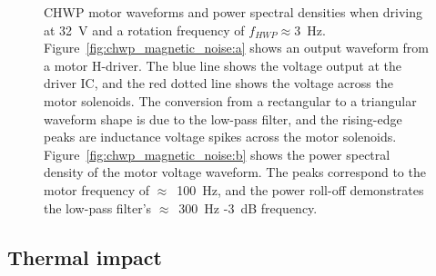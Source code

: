 \begin{figure}
    \caption[CHWP motor waveforms and power spectral densities. ]{CHWP motor waveforms and power spectral densities when driving at 32~V and a rotation frequency of $f_{HWP} \approx 3$~Hz. Figure~\ref{fig:chwp_magnetic_noise:a} shows an output waveform from a motor H-driver. The blue line shows the voltage output at the driver IC, and the red dotted line shows the voltage across the motor solenoids. The conversion from a rectangular to a triangular waveform shape is due to the low-pass filter, and the rising-edge peaks are inductance voltage spikes across the motor solenoids. Figure~\ref{fig:chwp_magnetic_noise:b} shows the power spectral density of the motor voltage waveform. The peaks correspond to the motor frequency of $\approx$~100~Hz, and the power roll-off demonstrates the low-pass filter's $\approx$~300~Hz -3~dB frequency.}
    \label{fig:chwp_magnetic_noise}
\end{figure}


\subsection{Thermal impact}
\label{sec:pb2a_chwp_evaluation_thermal_impact}

